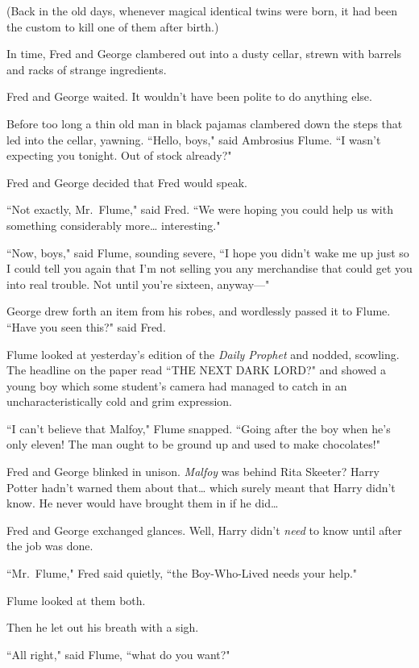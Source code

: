 (Back in the old days, whenever magical identical twins were born, it had been the custom to kill one of them after birth.)

In time, Fred and George clambered out into a dusty cellar, strewn with barrels and racks of strange ingredients.

Fred and George waited. It wouldn't have been polite to do anything else.

Before too long a thin old man in black pajamas clambered down the steps that led into the cellar, yawning. ``Hello, boys," said Ambrosius Flume. ``I wasn't expecting you tonight. Out of stock already?"

Fred and George decided that Fred would speak.

``Not exactly, Mr.~Flume," said Fred. ``We were hoping you could help us with something considerably more{\ldots} interesting."

``Now, boys," said Flume, sounding severe, ``I hope you didn't wake me up just so I could tell you again that I'm not selling you any merchandise that could get you into real trouble. Not until you're sixteen, anyway—"

George drew forth an item from his robes, and wordlessly passed it to Flume. ``Have you seen this?" said Fred.

Flume looked at yesterday's edition of the \emph{Daily Prophet} and nodded, scowling. The headline on the paper read ``THE NEXT DARK LORD?" and showed a young boy which some student's camera had managed to catch in an uncharacteristically cold and grim expression.

``I can't believe that Malfoy," Flume snapped. ``Going after the boy when he's only eleven! The man ought to be ground up and used to make chocolates!"

Fred and George blinked in unison. \emph{Malfoy} was behind Rita Skeeter? Harry Potter hadn't warned them about that{\ldots} which surely meant that Harry didn't know. He never would have brought them in if he did{\ldots}

Fred and George exchanged glances. Well, Harry didn't \emph{need} to know until after the job was done.

``Mr.~Flume," Fred said quietly, ``the Boy-Who-Lived needs your help."

Flume looked at them both.

Then he let out his breath with a sigh.

``All right," said Flume, ``what do you want?"

